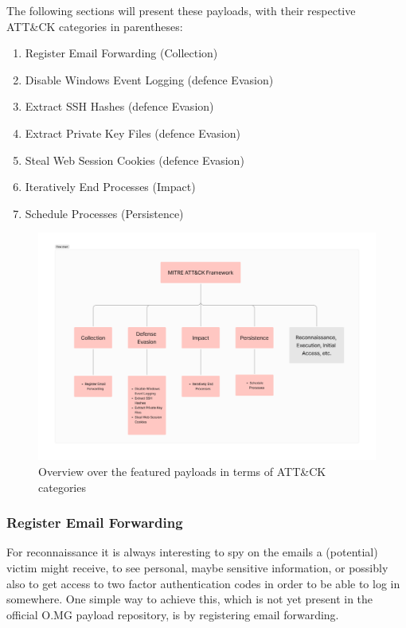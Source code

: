 The following sections will present these payloads, with their respective ATT\&CK categories in parentheses:
\begin{enumerate}
    \item Register Email Forwarding (Collection)
    \item Disable Windows Event Logging (defence Evasion)
    \item Extract SSH Hashes (defence Evasion)
    \item Extract Private Key Files (defence Evasion)
    \item Steal Web Session Cookies (defence Evasion)
    \item Iteratively End Processes (Impact)
    \item Schedule Processes (Persistence)
\end{enumerate}


\begin{figure}[H]
    \centering
    \includegraphics[width=1\linewidth]{visuals/payloads_overview.png}
    \caption{Overview over the featured payloads in terms of ATT\&CK categories}
\end{figure}





\subsubsection{Register Email Forwarding}

For reconnaissance it is always interesting to spy on the emails a (potential) victim might receive, to see personal, maybe sensitive information, or possibly also to get access to two factor authentication codes in order to be able to log in somewhere. One simple way to achieve this, which is not yet present in the official O.MG payload repository, is by registering email forwarding. 



